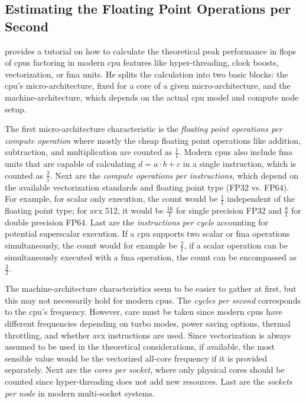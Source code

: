 \subsection{Estimating the Floating Point Operations per Second}
\label{sec:perf:peak_flops}

\citet{dolbeau_theoretical_2018} provides a tutorial on how to calculate the theoretical peak performance in \gls{flops} of \glspl{cpu} factoring in modern \gls{cpu} features like hyper-threading, clock boosts, vectorization, or \gls{fma} units. 
He splits the calculation into two basic blocks: the \gls{cpu}'s micro-architecture, fixed for a core of a given micro-architecture, and the machine-architecture, which depends on the actual \gls{cpu} model and compute node setup. 

The first micro-architecture characteristic is the \textit{floating point operations per compute operation} where mostly the cheap floating point operations like addition, subtraction, and multiplication are counted as $\frac{1}{1}$. 
Modern \glspl{cpu} also include \gls{fma} units that are capable of calculating $d = a \cdot b + c$ in a single instruction, which is counted as $\frac{2}{1}$.
Next are the \textit{compute operations per instructions}, which depend on the available vectorization standards and floating point type (FP32 vs. FP64). 
For example, for scalar only execution, the count would be $\frac{1}{1}$ independent of the floating point type; for \gls{avx} 512, it would be $\frac{16}{1}$ for single precision FP32 and $\frac{8}{1}$ for double precision FP64. 
Last are the \textit{instructions per cycle} accounting for potential superscalar execution. 
If a \gls{cpu} supports two scalar or \gls{fma} operations simultaneously, the count would for example be $\frac{2}{1}$, if a scalar operation can be simultaneously executed with a \gls{fma} operation, the count can be encompassed as $\frac{3}{2}$.

The machine-architecture characteristics seem to be easier to gather at first, but this may not necessarily hold for modern \glspl{cpu}. 
The \textit{cycles per second} corresponds to the \gls{cpu}'s frequency. 
However, care must be taken since modern \glspl{cpu} have different frequencies depending on turbo modes, power saving options, thermal throttling, and whether \gls{avx} instructions are used. 
Since vectorization is always assumed to be used in the theoretical considerations, if available, the most sensible value would be the vectorized all-core frequency if it is provided separately.  
Next are the \textit{cores per socket}, where only physical cores should be counted since hyper-threading does not add new resources. 
Last are the \textit{sockets per node} in modern multi-socket systems. 

